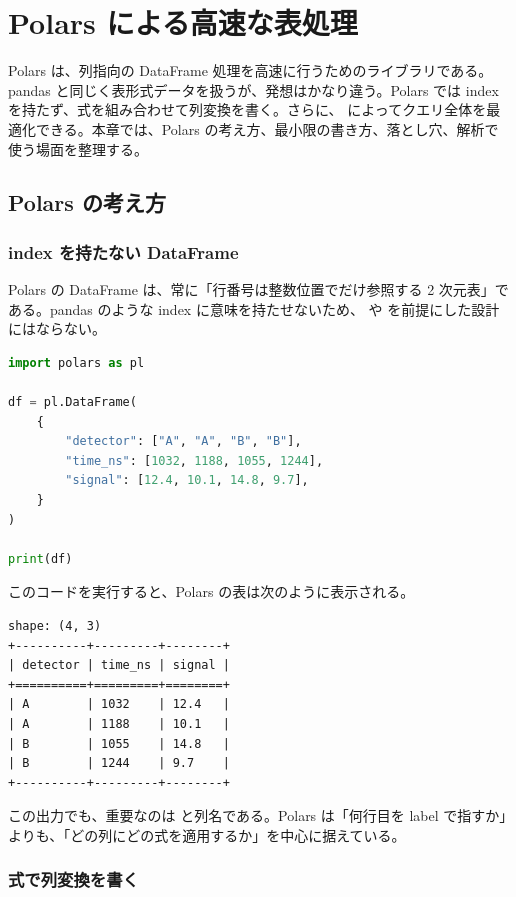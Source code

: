 \chapter{Polars による高速な表処理}
\label{chap:polars}

Polars は、列指向の DataFrame 処理を高速に行うためのライブラリである。pandas と同じく表形式データを扱うが、発想はかなり違う。Polars では index を持たず、式を組み合わせて列変換を書く。さらに、 によってクエリ全体を最適化できる。本章では、Polars の考え方、最小限の書き方、落とし穴、解析で使う場面を整理する。

\section{Polars の考え方}

\subsection{index を持たない DataFrame}

Polars の DataFrame は、常に「行番号は整数位置でだけ参照する 2 次元表」である。pandas のような index に意味を持たせないため、 や  を前提にした設計にはならない。

\begin{lstlisting}[language=Python]
import polars as pl

df = pl.DataFrame(
    {
        "detector": ["A", "A", "B", "B"],
        "time_ns": [1032, 1188, 1055, 1244],
        "signal": [12.4, 10.1, 14.8, 9.7],
    }
)

print(df)
\end{lstlisting}

このコードを実行すると、Polars の表は次のように表示される。

\begin{lstlisting}[numbers=none, xleftmargin=2\zw]
shape: (4, 3)
+----------+---------+--------+
| detector | time_ns | signal |
+==========+=========+========+
| A        | 1032    | 12.4   |
| A        | 1188    | 10.1   |
| B        | 1055    | 14.8   |
| B        | 1244    | 9.7    |
+----------+---------+--------+
\end{lstlisting}

この出力でも、重要なのは  と列名である。Polars は「何行目を label で指すか」よりも、「どの列にどの式を適用するか」を中心に据えている。

\subsection{式で列変換を書く}

